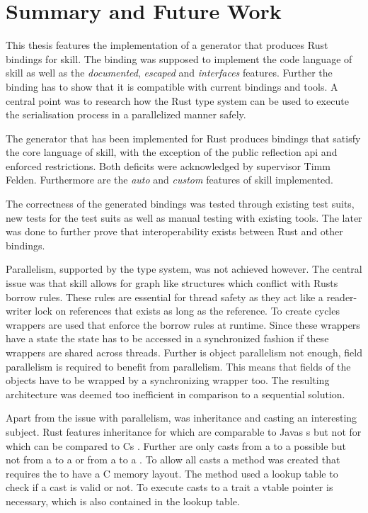 \documentclass[thesis]{subfiles}
\begin{document}
\chapter{Summary and Future Work}%
\vspace*{-.12em}%
This thesis features the implementation of a generator that produces Rust bindings for \gls{skill}.
The binding was supposed to implement the code language of \gls{skill} as well as the \emph{documented}, \emph{escaped} and \emph{interfaces} features.
Further the binding has to show that it is compatible with current bindings and tools.
A central point was to research how the Rust type system can be used to execute the serialisation process in a parallelized manner safely.

The generator that has been implemented for Rust produces bindings that satisfy the core language of \gls{skill}, with the exception of the public reflection \gls{api} and  enforced restrictions.
Both deficits were acknowledged by supervisor Timm Felden.
Furthermore are the \emph{auto} and \emph{custom} features of \gls{skill} implemented.

The correctness of the generated bindings was tested through existing test suits, new tests for the test suits as well as manual testing with existing tools.
The later was done to further prove that interoperability exists between Rust and other bindings.

Parallelism, supported by the type system, was not achieved however.
The central issue was that \gls{skill} allows for graph like structures which conflict with Rusts borrow rules.
These rules are essential for thread safety as they act like a reader-writer lock on references that exists as long as the reference.
To create cycles wrappers are used that enforce the borrow rules at runtime.
Since these wrappers have a state the state has to be accessed in a synchronized fashion if these wrappers are shared across threads.
Further is object parallelism not enough, field parallelism is required to benefit from parallelism.
This means that fields of the objects have to be wrapped by a synchronizing wrapper too.
The resulting architecture was deemed too inefficient in comparison to a sequential solution.

Apart from the issue with parallelism, was inheritance and casting an interesting subject.
Rust features inheritance for \traits which are comparable to Javas s but not for \structs which can be compared to Cs \structs.
Further are only casts from a \struct to a \trait possible but not from a \trait to a \struct or from a \trait to a \trait.
To allow all casts a method was created that requires the \structs to have a C memory layout.
The method used a lookup table to check if a cast is valid or not.
To execute casts to a trait a vtable pointer is necessary, which is also contained in the lookup table.
\end{document}
